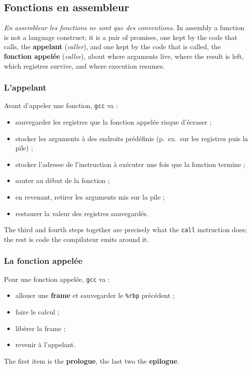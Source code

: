 \subsection{Fonctions en assembleur}
\begin{definition}
  \emph{En assembleur les fonctions ne sont que des conventions.} In assembly a
  function is not a language construct; it is a pair of promises, one kept by
  the code that calls, the \textbf{appelant} (\textit{caller}), and one kept by
  the code that is called, the \textbf{fonction appelée} (\textit{callee}), about
  where arguments live, where the result is left, which registres survive, and
  where execution resumes.
\end{definition}

\subsubsection{L'appelant}
Avant d'appeler une fonction, \texttt{gcc} va :
\begin{itemize}
  \item sauvegarder les registres que la fonction appelée risque d'écraser ;
  \item stocker les arguments à des endroits prédéfinis (p.~ex.\ sur les
    registres puis la pile) ;
  \item stocker l'adresse de l'instruction à exécuter une fois que la fonction
    termine ;
  \item sauter au début de la fonction ;
  \item en revenant, retirer les arguments mis sur la pile ;
  \item restaurer la valeur des registres sauvegardés.
\end{itemize}
The third and fourth steps together are precisely what the \texttt{call}
instruction does; the rest is code the compilateur emits around it.

\subsubsection{La fonction appelée}
Pour une fonction appelée, \texttt{gcc} va :
\begin{itemize}
  \item allouer une \textbf{frame} et sauvegarder le \texttt{\%rbp} précédent ;
  \item faire le calcul ;
  \item libérer la frame ;
  \item revenir à l'appelant.
\end{itemize}
The first item is the \textbf{prologue}, the last two the \textbf{epilogue}.

